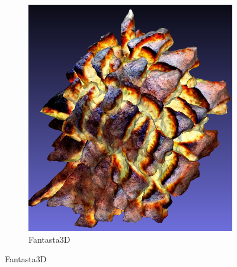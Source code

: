 \begin{figure}[ht]
    \begin{subfigure}[b]{0.2\textwidth}
        \centering
        \includegraphics[width=\textwidth]{etc/a rendering of a highly symmetrical loaf of bread/fantasia3d/fantasia_bread_result.png}
        \caption{Fantasta3D}
        \vspace{0.1cm}
    \end{subfigure}


\end{figure}
